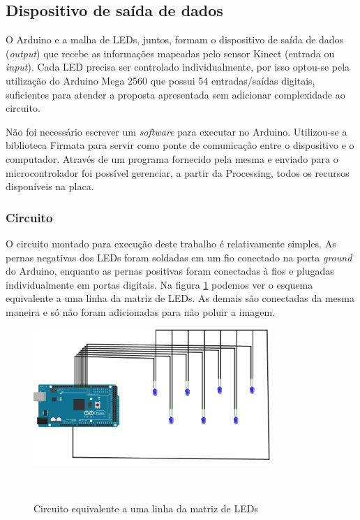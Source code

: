\subsection{\textbf{Dispositivo de saída de dados}}

O Arduino e a malha de LEDs, juntos, formam o dispositivo de saída de dados (\textit{output}) que recebe as informações mapeadas pelo sensor Kinect (entrada ou \textit{input}). Cada LED precisa ser controlado individualmente, por isso optou-se pela utilização do Arduino Mega 2560 que possui 54 entradas/saídas digitais, suficientes para atender a proposta apresentada sem adicionar complexidade ao circuito.


Não foi necessário escrever um \textit{software} para executar no Arduino. Utilizou-se a biblioteca Firmata para servir como ponte de comunicação entre o dispositivo e o computador. Através de um programa fornecido pela mesma e enviado para o microcontrolador foi possível gerenciar, a partir da Processing, todos os recursos disponíveis na placa.

\subsubsection{Circuito}

O circuito montado para execução deste trabalho é relativamente simples. As pernas negativas dos LEDs foram soldadas em um fio conectado na porta \textit{ground} do Arduino, enquanto as pernas positivas foram conectadas à fios e plugadas individualmente em portas digitais. Na figura \ref{fig:breadboard} podemos ver o esquema equivalente a uma linha da matriz de LEDs. As demais são conectadas da mesma maneira e só não foram adicionadas para não poluir a imagem.

\begin{figure}[H]
  \begin{center}
    \caption{Circuito equivalente a uma linha da matriz de LEDs}
    \vspace*{0,2cm}
    \includegraphics[width=0.8\textwidth]{./04-figuras/breadboard}
    \label{fig:breadboard}
  \end{center}
  \vspace*{-0,9cm}
  \\
\end{figure}

